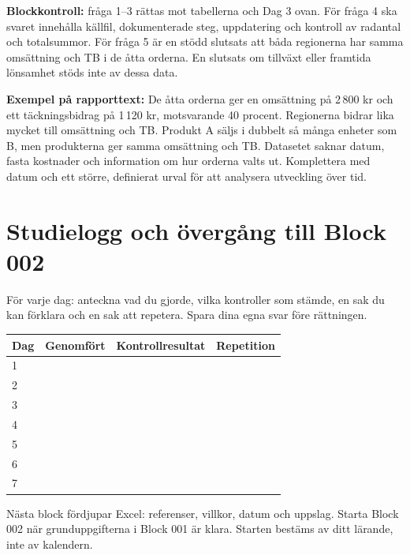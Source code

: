 \documentclass[11pt,a4paper]{article}
\begin{document}
\textbf{Blockkontroll:} fråga 1--3 rättas mot tabellerna och Dag 3 ovan. För fråga 4 ska svaret innehålla källfil, dokumenterade steg, uppdatering och kontroll av radantal och totalsummor. För fråga 5 är en stödd slutsats att båda regionerna har samma omsättning och TB i de åtta orderna. En slutsats om tillväxt eller framtida lönsamhet stöds inte av dessa data.

\textbf{Exempel på rapporttext:} De åtta orderna ger en omsättning på 2\,800 kr och ett täckningsbidrag på 1\,120 kr, motsvarande 40 procent. Regionerna bidrar lika mycket till omsättning och TB. Produkt A säljs i dubbelt så många enheter som B, men produkterna ger samma omsättning och TB. Datasetet saknar datum, fasta kostnader och information om hur orderna valts ut. Komplettera med datum och ett större, definierat urval för att analysera utveckling över tid.

\section{Studielogg och övergång till Block 002}
För varje dag: anteckna vad du gjorde, vilka kontroller som stämde, en sak du kan förklara och en sak att repetera. Spara dina egna svar före rättningen.

\begin{tabularx}{\textwidth}{@{}lXXX@{}}
\toprule
Dag & Genomfört & Kontrollresultat & Repetition\\
\midrule
1 & & & \\[7mm]
2 & & & \\[7mm]
3 & & & \\[7mm]
4 & & & \\[7mm]
5 & & & \\[7mm]
6 & & & \\[7mm]
7 & & & \\[7mm]
\bottomrule
\end{tabularx}

Nästa block fördjupar Excel: referenser, villkor, datum och uppslag. Starta Block 002 när grunduppgifterna i Block 001 är klara. Starten bestäms av ditt lärande, inte av kalendern.
\end{document}
